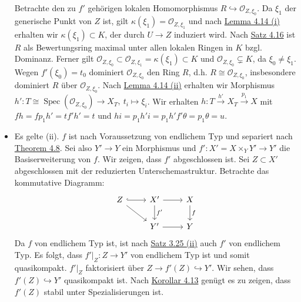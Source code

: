 \documentclass[11pt,b5paper,openany]{memoir}
\begin{document}
\begin{itemize}
Betrachte den zu $f'$ gehörigen lokalen Homomorphismus $R\hookrightarrow\mathcal{O}_{Z,\xi_0}$. Da $\xi_1$ der generische Punkt von $Z$ ist, gilt $\kappa(\xi_1)=\mathcal{O}_{Z,\xi_1}$ und nach \hyperref[4.14]{Lemma 4.14 (i)} erhalten wir $\kappa(\xi_1)\subset K$, der durch $U\to Z$ induziert wird. Nach \hyperref[4.16]{Satz 4.16} ist $R$ als Bewertungsring maximal unter allen lokalen Ringen in $K$ bzgl. Dominanz. Ferner gilt $\mathcal{O}_{Z,\xi_0}\subset\mathcal{O}_{Z,\xi_1}=\kappa(\xi_1)\subset K$ und $\mathcal{O}_{Z,\xi_0}\subsetneq K$, da $\xi_0\neq\xi_1$. Wegen $f'(\xi_0)=t_0$ dominiert $\mathcal{O}_{Z,\xi_0}$ den Ring $R$, d.h. $R\cong\mathcal{O}_{Z,\xi_0}$, insbesondere dominiert $R$ über $\mathcal{O}_{Z,\xi_0}$. Nach \hyperref[4.14]{Lemma 4.14 (ii)} erhalten wir Morphismus $h':T\cong\operatorname{Spec}(\mathcal{O}_{Z,\xi_0})\to X_T,\ t_i\mapsto \xi_i$. Wir erhalten $h:T\stackrel{h'}{\to}X_T\stackrel{p_1}{\to}X$ mit $fh=fp_1h'=tf'h'=t$ und $hi=p_1h'i=p_1h'f'\theta = p_1\theta = u$.
\item Es gelte (ii). $f$ ist nach Voraussetzung von endlichem Typ und separiert nach \hyperref[4.8]{Theorem 4.8}. Sei also $Y'\to Y$ ein Morphismus und $f':X'=X\times_YY'\to Y'$ die Basiserweiterung von $f$. Wir zeigen, dass $f'$ abgeschlossen ist. Sei $Z\subset X'$ abgeschlossen mit der reduzierten Unterschemastruktur. Betrachte das kommutative Diagramm:
\[ \begin{tikzcd}
Z\ar[r, hook]\ar[dr] & X'\ar[r]\ar[d, "f'"] & X\ar[d, "f"]\\
& Y'\ar[r] & Y
\end{tikzcd} \]
Da $f$ von endlichem Typ ist, ist nach \hyperref[3.25]{Satz 3.25 (ii)} auch $f'$ von endlichem Typ. Es folgt, dass $f'|_Z:Z\to Y'$ von endlichem Typ ist und somit quasikompakt. $f'|_Z$ faktorisiert über $Z\to f'(Z)\hookrightarrow Y'$. Wir sehen, dass $f'(Z)\hookrightarrow Y'$ quasikompakt ist. Nach \hyperref[4.13]{Korollar 4.13} genügt es zu zeigen, dass $f'(Z)$ stabil unter Spezialisierungen ist.


\end{itemize}
\end{document}
